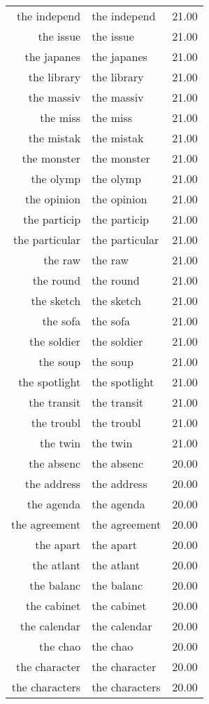\begin{table}[ht]
\begin{tabular}{rlr}
  the independ & the independ & 21.00 \\ 
  the issue & the issue & 21.00 \\ 
  the japanes & the japanes & 21.00 \\ 
  the library & the library & 21.00 \\ 
  the massiv & the massiv & 21.00 \\ 
  the miss & the miss & 21.00 \\ 
  the mistak & the mistak & 21.00 \\ 
  the monster & the monster & 21.00 \\ 
  the olymp & the olymp & 21.00 \\ 
  the opinion & the opinion & 21.00 \\ 
  the particip & the particip & 21.00 \\ 
  the particular & the particular & 21.00 \\ 
  the raw & the raw & 21.00 \\ 
  the round & the round & 21.00 \\ 
  the sketch & the sketch & 21.00 \\ 
  the sofa & the sofa & 21.00 \\ 
  the soldier & the soldier & 21.00 \\ 
  the soup & the soup & 21.00 \\ 
  the spotlight & the spotlight & 21.00 \\ 
  the transit & the transit & 21.00 \\ 
  the troubl & the troubl & 21.00 \\ 
  the twin & the twin & 21.00 \\ 
  the absenc & the absenc & 20.00 \\ 
  the address & the address & 20.00 \\ 
  the agenda & the agenda & 20.00 \\ 
  the agreement & the agreement & 20.00 \\ 
  the apart & the apart & 20.00 \\ 
  the atlant & the atlant & 20.00 \\ 
  the balanc & the balanc & 20.00 \\ 
  the cabinet & the cabinet & 20.00 \\ 
  the calendar & the calendar & 20.00 \\ 
  the chao & the chao & 20.00 \\ 
  the character & the character & 20.00 \\ 
  the characters & the characters & 20.00 \\ 

\end{tabular}
\end{table}
